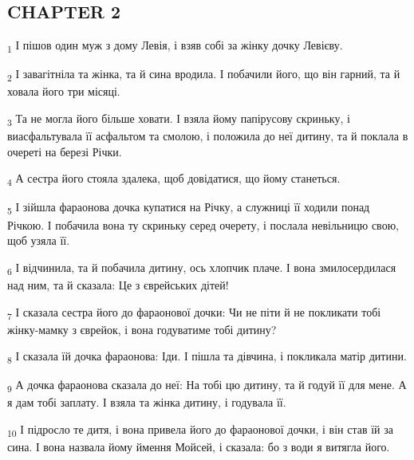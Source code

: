 \subsection{CHAPTER 2}
\begin{tcolorbox}
\textsubscript{1} І пішов один муж з дому Левія, і взяв собі за жінку дочку Левієву.
\end{tcolorbox}
\begin{tcolorbox}
\textsubscript{2} І завагітніла та жінка, та й сина вродила. І побачили його, що він гарний, та й ховала його три місяці.
\end{tcolorbox}
\begin{tcolorbox}
\textsubscript{3} Та не могла його більше ховати. І взяла йому папірусову скриньку, і виасфальтувала її асфальтом та смолою, і положила до неї дитину, та й поклала в очереті на березі Річки.
\end{tcolorbox}
\begin{tcolorbox}
\textsubscript{4} А сестра його стояла здалека, щоб довідатися, що йому станеться.
\end{tcolorbox}
\begin{tcolorbox}
\textsubscript{5} І зійшла фараонова дочка купатися на Річку, а служниці її ходили понад Річкою. І побачила вона ту скриньку серед очерету, і послала невільницю свою, щоб узяла її.
\end{tcolorbox}
\begin{tcolorbox}
\textsubscript{6} І відчинила, та й побачила дитину, ось хлопчик плаче. І вона змилосердилася над ним, та й сказала: Це з єврейських дітей!
\end{tcolorbox}
\begin{tcolorbox}
\textsubscript{7} І сказала сестра його до фараонової дочки: Чи не піти й не покликати тобі жінку-мамку з єврейок, і вона годуватиме тобі дитину?
\end{tcolorbox}
\begin{tcolorbox}
\textsubscript{8} І сказала їй дочка фараонова: Іди. І пішла та дівчина, і покликала матір дитини.
\end{tcolorbox}
\begin{tcolorbox}
\textsubscript{9} А дочка фараонова сказала до неї: На тобі цю дитину, та й годуй її для мене. А я дам тобі заплату. І взяла та жінка дитину, і годувала її.
\end{tcolorbox}
\begin{tcolorbox}
\textsubscript{10} І підросло те дитя, і вона привела його до фараонової дочки, і він став їй за сина. І вона назвала йому ймення Мойсей, і сказала: бо з води я витягла його.
\end{tcolorbox}
